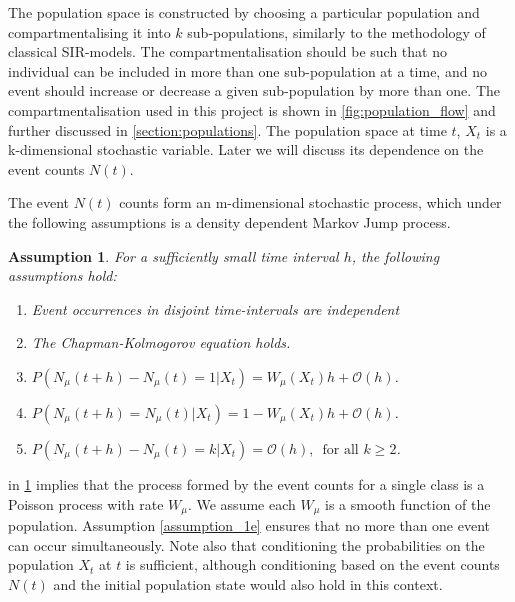 \documentclass[10pt,a4paper]{article}
\newtheorem{assumption}{Assumption}
\begin{document}
The population space is constructed by choosing a particular population and compartmentalising it into $k$ sub-populations, similarly to the methodology of classical SIR-models. The compartmentalisation should be such that no individual can be included in more than one sub-population at a time, and no event should increase or decrease a given sub-population by more than one. The compartmentalisation used in this project is shown in \cref{fig:population_flow} and further discussed in \cref{section:populations}. The population space at time $t$, $X_t$ is a k-dimensional stochastic variable. Later we will discuss its dependence on the event counts $N \left( t \right)$.

The event $N\left( t \right)$ counts form an m-dimensional stochastic process, which under the following assumptions is a density dependent Markov Jump process.

\begin{assumption} For a sufficiently small time interval $h$, the following assumptions hold:
	\begin{enumerate}
		\item Event occurrences in disjoint time-intervals are independent \label{assumption_1a}

		\item The Chapman-Kolmogorov equation \cite{Kolmogoroff1931,Feller1940} holds.  \label{assumption_1b}

		\item $P\left( N_{\mu} \left( t  + h \right)  - N_{\mu} \left( t \right) = 1 | X_t \right) = W_{\mu} \left( X_t \right) h + \mathcal{O} \left( h \right)$. \label{assumption_1c}
	
		\item $P\left( N_{\mu}\left( t+h\right) = N_{\mu} \left( t \right) | X_t \right) = 1-W_{\mu}\left( X_t \right) h + \mathcal{O}\left( h \right)$. \label{assumption_1d}

		\item $P\left( N_{\mu}\left( t + h \right ) - N_{\mu} \left( t \right) = k | X_t \right)= \mathcal{O}\left( h \right) , \, \textrm{ for all } k \geq 2$. \label{assumption_1e}
	\end{enumerate} \label{assumption_1}
\end{assumption}

 in \cref{assumption_1} implies that the process formed by the event counts for a single class is a Poisson process with rate $W_{\mu}$. We assume each $W_{\mu}$ is a smooth function of the population. Assumption \ref{assumption_1e} ensures that no more than one event can occur simultaneously. Note also that conditioning the probabilities on the population $X_t$ at $t$ is sufficient, although conditioning based on the event counts $N\left( t \right)$ and the initial population state would also hold in this context.
\end{document}
